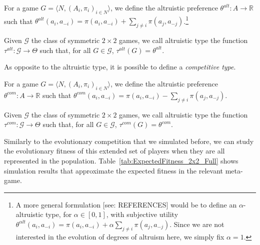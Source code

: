 \documentclass[fleqn,reqno,11pt]{article}
\begin{document}
\begin{definition} \label{defn:altpref}

For a game $ G=\langle N, (A_i , \pi_i)_{i \in N} \rangle $, we define the altruistic preference $ \theta^{alt}: A \rightarrow \mathbb{R} $ such that $ \theta^{alt}(a_i,a_{-i})=\pi(a_i,a_{-i}) + \sum_{j \neq i} \pi(a_{j},a_{-j})$.\footnote{A more general formulation [see: REFERENCES] would be to define an $ \alpha$-altruistic type, for $\alpha \in [0,1]$, with subjective utility $ \theta^{\alpha lt}(a_i,a_{-i})=\pi(a_i,a_{-i}) + \alpha \sum_{j \neq i} \pi(a_{j},a_{-j})$. Since we are not interested in the evolution of degrees of altruism here, we simply fix $ \alpha = 1 $.}

\end{definition}

\begin{definition} \label{defn:alttype}

Given $ \mathcal{G} $ the class of symmetric $ 2 \times 2 $ games, we call altruistic type the function $\tau^{alt}: \mathcal{G} \rightarrow  \Theta$ such that, for all $G \in \mathcal{G}$, $ \tau^{alt}(G)= \theta^{alt}$.

\end{definition}

\noindent As opposite to the altruistic type, it is possible to define a \textit{competitive type}. 

\begin{definition} \label{defn:compref}

For a game $ G=\langle N, (A_i , \pi_i)_{i \in N} \rangle $, we define the altruistic preference $ \theta^{com}: A \rightarrow \mathbb{R} $ such that $ \theta^{com}(a_i,a_{-i})=\pi(a_i,a_{-i}) - \sum_{j \neq i} \pi(a_{j},a_{-j})$.

\end{definition}

\begin{definition} \label{defn:comtype}

Given $ \mathcal{G} $ the class of symmetric $ 2 \times 2 $ games, we call altruistic type the function $\tau^{com}: \mathcal{G} \rightarrow  \Theta$ such that, for all $G \in \mathcal{G}$, $ \tau^{com}(G)= \theta^{com}$.

\end{definition}

Similarly to the evolutionary competition that we simulated before, we can study the
evolutionary fitness of this extended set of players when they are all represented in the
population. Table~\ref{tab:ExpectedFitness_2x2_Full} shows simulation results that approximate the
expected fitness in the relevant meta-game.
\end{document}
